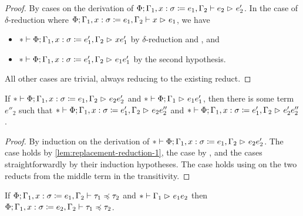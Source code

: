 \begin{proof}
By cases on the derivation of
$\Phi; \Gamma_1, x \mathrel{:} \sigma \mathrel{\coloneqq} e_1, \Gamma_2 \mathrel{\vdash} e_2 \mathrel{\rhd}_{} e'_2$.
In the case of $\delta$-reduction where
$\Phi; \Gamma_1, x \mathrel{:} \sigma \mathrel{\coloneqq} e_1, \Gamma_2 \mathrel{\vdash} x \mathrel{\rhd}_{} e_1$,
we have
\begin{itemize}[noitemsep]
  \item $* \mathrel{\vdash} \Phi; \Gamma_1, x \mathrel{:} \sigma \mathrel{\coloneqq} e'_1, \Gamma_2 \mathrel{\rhd}_{} x{e'_1}$ by $\delta$-reduction and , and
  \item $* \mathrel{\vdash} \Phi; \Gamma_1, x \mathrel{:} \sigma \mathrel{\coloneqq} e'_1, \Gamma_2 \mathrel{\rhd}_{} e_1{e'_1}$ by the second hypothesis.
\end{itemize}
All other cases are trivial, always reducing to the existing reduct.
\end{proof}

\begin{lemma} \label{lem:replacement-reduction-2}
If $* \mathrel{\vdash} \Phi; \Gamma_1, x \mathrel{:} \sigma \mathrel{\coloneqq} e_1, \Gamma_2 \mathrel{\rhd}_{} e_2{e'_2}$
and $* \mathrel{\vdash} \Phi; \Gamma_1 \mathrel{\rhd}_{} e_1{e'_1}$,
then there is some term $e''_2$
such that $* \mathrel{\vdash} \Phi; \Gamma_1, x \mathrel{:} \sigma \mathrel{\coloneqq} e'_1, \Gamma_2 \mathrel{\rhd}_{} e_2{e''_2}$
and $* \mathrel{\vdash} \Phi; \Gamma_1, x \mathrel{:} \sigma \mathrel{\coloneqq} e'_1, \Gamma_2 \mathrel{\rhd}_{} e'_2{e''_2}$.
\end{lemma}

\begin{proof}
By induction on the derivation of
$* \mathrel{\vdash} \Phi; \Gamma_1, x \mathrel{:} \sigma \mathrel{\coloneqq} e_1, \Gamma_2 \mathrel{\rhd}_{} e_2{e'_2}$.
The  case holds by \cref{lem:replacement-reduction-1},
the  case by ,
and the  cases straightforwardly by their induction hypotheses.
The  case holds using 
on the two reducts from the middle term in the transitivity.
\end{proof}

\begin{lemma} \label{lem:replacement-reduction-3}
If $\Phi; \Gamma_1, x \mathrel{:} \sigma \mathrel{\coloneqq} e_1, \Gamma_2 \mathrel{\vdash} \tau_1 \mathrel{\preccurlyeq} \tau_2$
and $* \mathrel{\vdash} \Gamma_1 \mathrel{\rhd}_{} e_1{e_2}$
then $\Phi; \Gamma_1, x \mathrel{:} \sigma \mathrel{\coloneqq} e_2, \Gamma_2 \mathrel{\vdash} \tau_1 \mathrel{\preccurlyeq} \tau_2$.
\end{lemma}


